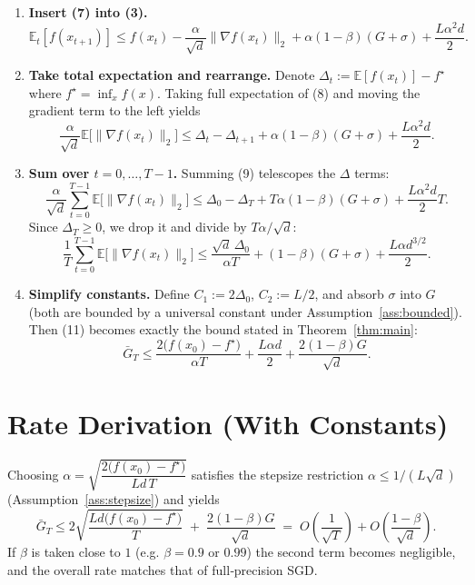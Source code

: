 \documentclass[11pt]{article}
\newcommand{\E}{\mathbb{E}}
\begin{document}
\begin{enumerate}
\item[Step 7.] \textbf{Insert (7) into (3).}  
\[
\E_t[f(x_{t+1})]\le f(x_t)
   -\frac{\alpha}{\sqrt{d}}\|\nabla f(x_t)\|_{2}
   +\alpha(1-\beta)(G+\sigma)
   +\frac{L\alpha^{2}d}{2}. \tag{8}
\]

\item[Step 8.] \textbf{Take total expectation and rearrange.}  
Denote $\Delta_t:=\E[f(x_t)]-f^{\star}$ where $f^{\star}= \inf_x f(x)$.  Taking full expectation of (8) and moving the gradient term to the left yields
\[
\frac{\alpha}{\sqrt{d}}\E\!\big[\|\nabla f(x_t)\|_{2}\big]
   \le \Delta_t-\Delta_{t+1}
      +\alpha(1-\beta)(G+\sigma)
      +\frac{L\alpha^{2}d}{2}. \tag{9}
\]

\item[Step 9.] \textbf{Sum over $t=0,\dots,T-1$.}  
Summing (9) telescopes the $\Delta$ terms:
\[
\frac{\alpha}{\sqrt{d}}\sum_{t=0}^{T-1}\E\!\big[\|\nabla f(x_t)\|_{2}\big]
   \le \Delta_0-\Delta_T
      +T\alpha(1-\beta)(G+\sigma)
      +\frac{L\alpha^{2}d}{2}T . \tag{10}
\]
Since $\Delta_T\ge0$, we drop it and divide by $T\alpha/\sqrt{d}$:
\[
\frac{1}{T}\sum_{t=0}^{T-1}\E\!\big[\|\nabla f(x_t)\|_{2}\big]
   \le \frac{\sqrt{d}\,\Delta_0}{\alpha T}
      + (1-\beta)(G+\sigma)
      + \frac{L\alpha d^{3/2}}{2}. \tag{11}
\]

\item[Step 10.] \textbf{Simplify constants.}  
Define $C_1:=2\Delta_0$, $C_2:=L/2$, and absorb $\sigma$ into $G$ (both are bounded by a universal constant under Assumption~\ref{ass:bounded}).  Then (11) becomes exactly the bound stated in Theorem~\ref{thm:main}:
\[
\bar{G}_T\le
\frac{2\big(f(x_0)-f^{\star}\big)}{\alpha T}
   +\frac{L\alpha d}{2}
   +\frac{2(1-\beta)G}{\sqrt{d}} .
\] 
\qedhere
\end{enumerate}

\section*{Rate Derivation (With Constants)}
Choosing $\alpha = \sqrt{\dfrac{2\big(f(x_0)-f^{\star}\big)}{L d\,T}}$ satisfies the stepsize restriction
$\alpha\le 1/(L\sqrt{d})$ (Assumption~\ref{ass:stepsize}) and yields
\[
\bar{G}_T
   \le
   2\sqrt{\frac{L d\big(f(x_0)-f^{\star}\big)}{T}}
   \;+\;
   \frac{2(1-\beta)G}{\sqrt{d}}
   \;=\;
   O\!\left(\frac{1}{\sqrt{T}}\right) + O\!\left(\frac{1-\beta}{\sqrt{d}}\right).
\]
If $\beta$ is taken close to $1$ (e.g. $\beta=0.9$ or $0.99$) the second term becomes negligible, and the overall rate matches that of full‑precision SGD.
\end{document}

